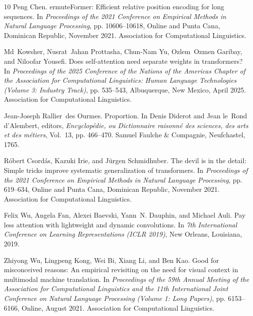 \documentclass{nlp2026}
\begin{document}
\begin{thebibliography}{10}
Peng Chen.
ermute{F}ormer: Efficient relative position encoding for long sequences.
\newblock In {\em Proceedings of the 2021 Conference on Empirical Methods in Natural Language Processing}, pp. 10606--10618, Online and Punta Cana, Dominican Republic, November 2021. Association for Computational Linguistics.

Md~Kowsher, Nusrat~Jahan Prottasha, Chun-Nam Yu, Ozlem~Ozmen Garibay, and Niloofar Yousefi.
\newblock Does self-attention need separate weights in transformers?
\newblock In {\em Proceedings of the 2025 Conference of the Nations of the Americas Chapter of the Association for Computational Linguistics: Human Language Technologies (Volume 3: Industry Track)}, pp. 535--543, Albuquerque, New Mexico, April 2025. Association for Computational Linguistics.

Jean-Joseph Rallier~des Ourmes.
\newblock Proportion.
\newblock In Denis Diderot and Jean le~Rond d'Alembert, editors, {\em Encyclop{\'e}die, ou Dictionnaire raisonn{\'e} des sciences, des arts et des m{\'e}tiers}, Vol.~13, pp. 466--470. Samuel Faulche \& Compagnie, Neufchastel, 1765.

R{\'o}bert Csord{\'a}s, Kazuki Irie, and J{\"u}rgen Schmidhuber.
\newblock The devil is in the detail: Simple tricks improve systematic generalization of transformers.
\newblock In {\em Proceedings of the 2021 Conference on Empirical Methods in Natural Language Processing}, pp. 619--634, Online and Punta Cana, Dominican Republic, November 2021. Association for Computational Linguistics.

Felix Wu, Angela Fan, Alexei Baevski, Yann~N. Dauphin, and Michael Auli.
\newblock Pay less attention with lightweight and dynamic convolutions.
\newblock In {\em 7th International Conference on Learning Representations ({ICLR} 2019)}, New Orleans, Louisiana, 2019.

Zhiyong Wu, Lingpeng Kong, Wei Bi, Xiang Li, and Ben Kao.
\newblock Good for misconceived reasons: An empirical revisiting on the need for visual context in multimodal machine translation.
\newblock In {\em Proceedings of the 59th Annual Meeting of the Association for Computational Linguistics and the 11th International Joint Conference on Natural Language Processing (Volume 1: Long Papers)}, pp. 6153--6166, Online, August 2021. Association for Computational Linguistics.


\end{thebibliography}
\end{document}
